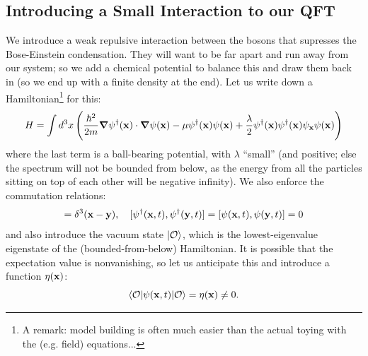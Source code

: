 \subsection{Introducing a Small Interaction to our QFT}
We introduce a weak repulsive interaction between the bosons that supresses the Bose-Einstein condensation. They will want to be far apart and run away from our system; so we add a chemical potential to balance this and draw them back in (so we end up with a finite density at the end). Let us write down a Hamiltonian\footnote{A remark: model building is often much easier than the actual toying with the (e.g. field) equations...} for this:
\begin{equation}
    H = \int d^3 x \left(\frac{\hbar^2}{2m}\nabla \psi^\dag(\v{x}) \cdot \nabla \psi(\v{x}) - \mu\psi^{\dag}(\v{x})\psi(\v{x}) + \frac{\lambda}{2}\psi^\dag(\v{x})\psi^{\dag}(\v{x})\psi_\v{x}\psi(\v{x})\right)
\end{equation}
where the last term is a ball-bearing potential, with $\lambda$ ``small'' (and positive; else the spectrum will not be bounded from below, as the energy from all the particles sitting on top of each other will be negative infinity). We also enforce the commutation relations:
\begin{equation}
    [\psi(\v{x}, t), \psi^{\dag}(\v{y}, t)] = \delta^3(\v{x} - \v{y}), \quad [\psi^\dag(\v{x}, t), \psi^{\dag}(\v{y}, t)] = [\psi(\v{x}, t), \psi(\v{y}, t)] = 0
\end{equation}
and also introduce the vacuum state $\lvert \mathcal{O} \rangle$, which is the lowest-eigenvalue eigenstate of the (bounded-from-below) Hamiltonian. It is possible that the expectation value is nonvanishing, so let us anticipate this and introduce a function $\eta(\mathbf{x})$:
\begin{equation}
    \langle \mathcal{O} \rvert\psi(\mathbf{x}, t)\lvert \mathcal{O} \rangle = \eta(\mathbf{x}) \neq 0.
\end{equation}

